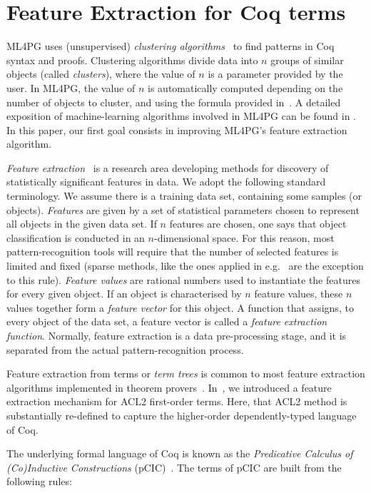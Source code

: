 \section{Feature Extraction for Coq terms}\label{sec:lemmaclustering}

ML4PG uses (unsupervised) \emph{clustering algorithms}~\cite{Bishop} to find patterns in Coq syntax and proofs.
Clustering algorithms
divide data into $n$ groups of similar objects (called \emph{clusters}), where the value of $n$
is a parameter provided by the user. In ML4PG, the value of $n$ is automatically computed depending on the number
of objects to cluster, and using the formula provided in~\cite{KHG13,lpar13}.
A detailed exposition of machine-learning algorithms involved in ML4PG can be found in \cite{KHG13}. In this paper, our first goal consists in improving ML4PG's feature extraction algorithm.


\emph{Feature extraction}~\cite{Bishop} is a research area developing methods for
discovery of statistically significant features in data.
We adopt the following standard terminology.
We assume there is a training data set, containing some samples (or objects).
\emph{Features} are given by a set of statistical parameters chosen to represent all objects in the given data set.
If $n$ features are chosen, one says that object classification is
conducted in an $n$-dimensional space.
For this reason, most pattern-recognition tools will require that
the number of selected features is limited and fixed (sparse methods, like the ones applied in
e.g.~\cite{lpar-urban,K13,UrbanSPV08} are the exception to this rule).
\emph{Feature values} are rational numbers used to instantiate the features for every given object.
If an object is characterised by $n$ feature values, these $n$ values together form a \emph{feature vector} for this object.
A function that assigns, to every object of the data set, a feature vector is called a \emph{feature extraction function}.
Normally, feature extraction is a data pre-processing stage, and it is separated from the actual pattern-recognition process.


Feature extraction from terms or \emph{term trees} is common to most feature extraction algorithms implemented
in theorem provers~\cite{lpar13,lpar-urban,K13,UrbanSPV08}. In~\cite{lpar13}, we introduced a feature extraction mechanism
for ACL2 first-order terms. Here, that ACL2 method is substantially re-defined to capture the higher-order dependently-typed language of Coq.


The underlying formal language of Coq is known as the \emph{Predicative Calculus of (Co)Inductive Constructions} (pCIC)~\cite{Coq,CoquandH88,CoPa89}.
The terms of pCIC are built from
the following rules:



